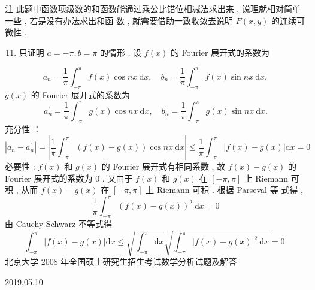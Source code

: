 \documentclass[10pt]{article}
\begin{document}
 注   此题中函数项级数的和函数能通过乘公比错位相减法求出来 ,  说理就相对简单一些 ,  若是没有办法求出和函   数 ,  就需要借助一致收敛去说明  $F(x, y)$  的连续可微性 .

\begin{enumerate}
  \setcounter{enumi}{10}
  \item  只证明  $a=-\pi, b=\pi$  的情形 .  设  $f(x)$  的  Fourier  展开式的系数为 
\end{enumerate}
$$
a_{n}=\frac{1}{\pi} \int_{-\pi}^{\pi} f(x) \cos n x \mathrm{~d} x, \quad b_{n}=\frac{1}{\pi} \int_{-\pi}^{\pi} f(x) \sin n x \mathrm{~d} x,
$$
$g(x)$  的  Fourier  展开式的系数为 
$$
a_{n}^{\prime}=\frac{1}{\pi} \int_{-\pi}^{\pi} g(x) \cos n x \mathrm{~d} x, \quad b_{n}^{\prime}=\frac{1}{\pi} \int_{-\pi}^{\pi} g(x) \sin n x \mathrm{~d} x .
$$
 充分性 ：
$$
\left|a_{n}-a_{n}^{\prime}\right|=\left|\frac{1}{\pi} \int_{-\pi}^{\pi}(f(x)-g(x)) \cos n x \mathrm{~d} x\right| \leqslant \frac{1}{\pi} \int_{-\pi}^{\pi}|f(x)-g(x)| \mathrm{d} x=0
$$
 必要性 : $f(x)$  和  $g(x)$  的  Fourier  展开式有相同系数 ,  故  $f(x)-g(x)$  的  Fourier  展开式的系数为  0 .  又由于  $f(x)$  和  $g(x)$  在  $[-\pi, \pi]$  上  Riemann  可积 ,  从而  $f(x)-g(x)$  在  $[-\pi, \pi]$  上  Riemann  可积 .  根据  Parseval  等   式得 ,
$$
\frac{1}{\pi} \int_{-\pi}^{\pi}(f(x)-g(x))^{2} \mathrm{~d} x=0
$$
 由  Cauchy-Schwarz  不等式得 
$$
\int_{-\pi}^{\pi}|f(x)-g(x)| \mathrm{d} x \leqslant \sqrt{\int_{-\pi}^{\pi} \mathrm{d} x} \sqrt{\int_{-\pi}^{\pi}|f(x)-g(x)|^{2} \mathrm{~d} x}=0 .
$$
 北京大学  2008  年全国硕士研究生招生考试数学分析试题及解答 

   

2019.05.10
\end{document}
